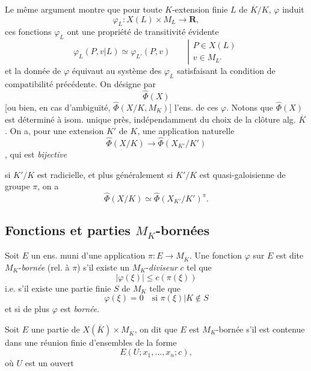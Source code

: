 \documentclass[11pt,a4paper]{article}
\begin{document}
Le même argument montre que pour toute $K$-extension finie $L$ de
$\overline{K}/K$, $\varphi$ induit
\[
  \varphi_L : X(L) \times M_L \to \mathbf{R} ,
\]
ces fonctions $\varphi_L$ ont une propriété de transitivité évidente
\[
  \varphi_L(P, v|L) \simeq \varphi_{L'}(P, v)
  \qquad \left| \begin{array}{l} P \in X(L) \\ v \in M_{L'} \end{array} \right.
\]
et la donnée de $\varphi$ équivaut au système des $\varphi_L$ satisfaisant
la condition de compatibilité précédente. On  désigne par
\[
  \widehat{\Phi}(X)
\]
[ou bien, en cas d'ambiguïté, $\widehat{\Phi}(X/K, M_K)$] l'ens. de ces
$\varphi$. Notons que $\widehat{\Phi}(X)$ est déterminé à isom. unique près,
indépendamment du choix de la clôture alg. $\overline{K}$. On a, pour une
extension  $K'$ de $K$, une application naturelle
\[
  \widehat{\Phi}(X/K) \to \widehat{\Phi}(X_{K'}/K')
\]
, qui est \emph{bijective}

si $K'/K$ est radicielle, et \struck{\ill{}} plus généralement
 si $K'/K$ est quasi-galoisienne de groupe $\pi$, on a
\[
  \widehat{\Phi}(X/K) \simeq \widehat{\Phi}(X_{K'}/K')^{\pi} .
\]

\subsection{Fonctions et parties $M_K$-bornées}


Soit $E$ un ens. muni d'une application $\pi : E \to M_{\overline{K}}$. Une
fonction $\varphi$ sur $E$ est dite $M_K$-\emph{bornée} (rel. à $\pi$) s'il
existe un $M_K$-\emph{diviseur} $c$ \struck{\ill{}} tel que
\[
  |\varphi(\xi)| \leqslant c(\pi(\xi))
\]
i.e. s'il existe \struck{\ill{}} une partie finie $S$ de $M_K$ telle que
\[
  \varphi(\xi) = 0 \quad \text{si } \pi(\xi)|K \notin S
\]
et si de plus $\varphi$ est \emph{bornée}. \struck{\ill{}}

Soit $E$  une
partie de $X(\overline{K}) \times M_{\overline{K}}$, on dit que $E$ est
$M_K$-bornée s'il \struck{\ill{}} est contenue dans une réunion
\struck{\ill{}} finie d'ensembles de la forme
\[
  E(U; x_1, \ldots, x_n; c) ,
\]
où $U$ est un ouvert
\end{document}
